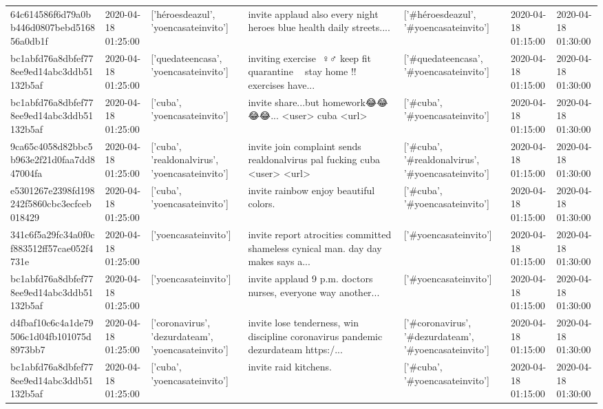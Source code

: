 \begin{tabular}{lllllll}
64c614586f6d79a0bb446d0807bebd516856a0db1f & 2020-04-18 01:25:00 & ['héroesdeazul', 'yoencasateinvito'] & invite applaud also every night heroes blue health daily streets.... & ['#héroesdeazul', '#yoencasateinvito'] & 2020-04-18 01:15:00 & 2020-04-18 01:30:00 \\
bc1abfd76a8dbfef778ee9ed14abc3ddb51132b5af & 2020-04-18 01:25:00 & ['quedateencasa', 'yoencasateinvito'] & inviting exercise ️ ♀️♂️ keep fit quarantine 💪💪 stay home !!️ exercises have... & ['#quedateencasa', '#yoencasateinvito'] & 2020-04-18 01:15:00 & 2020-04-18 01:30:00 \\
bc1abfd76a8dbfef778ee9ed14abc3ddb51132b5af & 2020-04-18 01:25:00 & ['cuba', 'yoencasateinvito'] & invite share...but homework😂😂😂😂... <user> cuba <url> & ['#cuba', '#yoencasateinvito'] & 2020-04-18 01:15:00 & 2020-04-18 01:30:00 \\
9ca65c4058d82bbc5b963e2f21d0faa7dd847004fa & 2020-04-18 01:25:00 & ['cuba', 'realdonalvirus', 'yoencasateinvito'] & invite join complaint sends realdonalvirus pal fucking cuba <user> <url> & ['#cuba', '#realdonalvirus', '#yoencasateinvito'] & 2020-04-18 01:15:00 & 2020-04-18 01:30:00 \\
e5301267e2398fd198242f5860cbc3ecfceb018429 & 2020-04-18 01:25:00 & ['cuba', 'yoencasateinvito'] & invite rainbow enjoy beautiful colors. & ['#cuba', '#yoencasateinvito'] & 2020-04-18 01:15:00 & 2020-04-18 01:30:00 \\
341c6f5a29fc34a0f0cf883512ff57cae052f4731e & 2020-04-18 01:25:00 & ['yoencasateinvito'] & invite report atrocities committed shameless cynical man. day day makes says a... & ['#yoencasateinvito'] & 2020-04-18 01:15:00 & 2020-04-18 01:30:00 \\
bc1abfd76a8dbfef778ee9ed14abc3ddb51132b5af & 2020-04-18 01:25:00 & ['yoencasateinvito'] & invite applaud 9 p.m. doctors nurses, everyone way another... & ['#yoencasateinvito'] & 2020-04-18 01:15:00 & 2020-04-18 01:30:00 \\
d4fbaf10c6c4a1de79506c1d04fb101075d8973bb7 & 2020-04-18 01:25:00 & ['coronavirus', 'dezurdateam', 'yoencasateinvito'] & invite lose tenderness, win discipline coronavirus pandemic dezurdateam https:/... & ['#coronavirus', '#dezurdateam', '#yoencasateinvito'] & 2020-04-18 01:15:00 & 2020-04-18 01:30:00 \\
bc1abfd76a8dbfef778ee9ed14abc3ddb51132b5af & 2020-04-18 01:25:00 & ['cuba', 'yoencasateinvito'] & invite raid kitchens. & ['#cuba', '#yoencasateinvito'] & 2020-04-18 01:15:00 & 2020-04-18 01:30:00 \\

\end{tabular}
